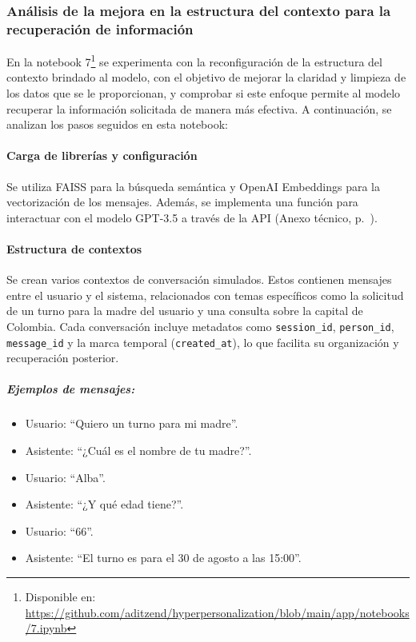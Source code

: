 \subsubsection{Análisis de la mejora en la estructura del contexto para la recuperación de información}

En la notebook 7\footnote{Disponible en: \url{https://github.com/aditzend/hyperpersonalization/blob/main/app/notebooks/7.ipynb}} se experimenta con la reconfiguración de la estructura del contexto brindado al modelo, con el objetivo de mejorar la claridad y limpieza de los datos que se le proporcionan, y comprobar si este enfoque permite al modelo recuperar la información solicitada de manera más efectiva. A continuación, se analizan los pasos seguidos en esta notebook:

\paragraph{Carga de librerías y configuración}

Se utiliza FAISS para la búsqueda semántica y OpenAI Embeddings para la vectorización de los mensajes. Además, se implementa una función para interactuar con el modelo GPT-3.5 a través de la API (Anexo técnico, p.~\pageref{anexo:code-4-1-7-1}).

\paragraph{Estructura de contextos}

Se crean varios contextos de conversación simulados. Estos contienen mensajes entre el usuario y el sistema, relacionados con temas específicos como la solicitud de un turno para la madre del usuario y una consulta sobre la capital de Colombia. Cada conversación incluye metadatos como \texttt{session\_id}, \texttt{person\_id}, \texttt{message\_id} y la marca temporal (\texttt{created\_at}), lo que facilita su organización y recuperación posterior.

\subparagraph{Ejemplos de mensajes:}
\begin{itemize}
    \item Usuario: ``Quiero un turno para mi madre''.
    \item Asistente: ``¿Cuál es el nombre de tu madre?''.
    \item Usuario: ``Alba''.
    \item Asistente: ``¿Y qué edad tiene?''.
    \item Usuario: ``66''.
    \item Asistente: ``El turno es para el 30 de agosto a las 15:00''.
\end{itemize}

